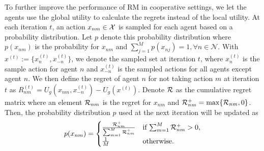 To further improve the performance of RM in cooperative settings, we let the agents use the global utility to calculate the regrets instead of the local utility. At each iteration $t$, an action $x_{nm} \in \mathcal{X}$ is sampled for each agent based on a probability distribution. Let $p$ denote this probability distribution where $p(x_{nm})$ is the probability for $x_{nm}$ and $\sum_{j=1}^{M} p(x_{nj}) = 1, \forall n \in \mathcal{N}$. With $x^{(t)} := \{x^{(t)}_n, x^{(t)}_{-n}\}$, we denote the sampled set at iteration $t$, where $x^{(t)}_n$ is the sample action for agent $n$ and $x^{(t)}_{-n}$ is the sampled actions for all agents except agent $n$. We then define the regret of agent $n$ for not taking action $m$ at iteration $t$ as
$R^{(t)}_{nm} = U_g(x_{nm}, x^{(t)}_{-n}) -  U_g(x^{(t)}).$
Denote $\mathcal{R}$ as the cumulative regret matrix where an element $\mathcal{R}_{nm}$ is the regret for $x_{nm}$ and $\mathcal{R}^+_{nm} = \max \{\mathcal{R}_{nm}, 0\}$. Then, the probability distribution $p$ used at the next iteration will be updated as
\begin{equation}
    p(x_{nm}) =
     \begin{cases} 
      \frac{\mathcal{R}^+_{nm}}{\sum_{m=1}^{M} \mathcal{R}^+_{nm}} & \text{if $\sum_{m=1}^{M} \mathcal{R}^+_{nm} > 0$,}\\
      \frac{1}{M} & \text{otherwise.}
    \end{cases}   \label{eq:prob_reget}
\end{equation}

